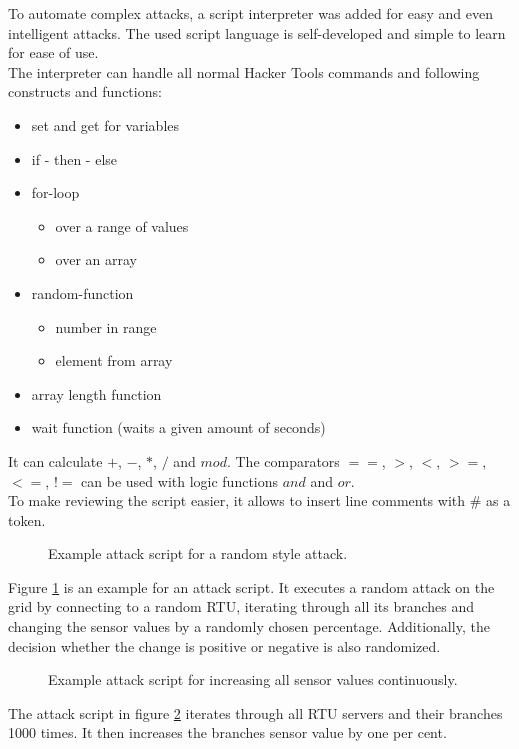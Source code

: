 \documentclass[conference]{IEEEtran}
\begin{document}
			To automate complex attacks, a script interpreter was added for easy and even intelligent attacks. The used script language is self-developed and simple to learn for ease of use.\\
			The interpreter can handle all normal Hacker Tools commands and following constructs and functions:
			\begin{itemize}
				\item set and get for variables
				\item if - then - else
				\item for-loop
					\begin{itemize}
						\item over a range of values
						\item over an array
					\end{itemize}
				\item random-function
					\begin{itemize}
						\item number in range
						\item element from array
					\end{itemize}
				\item array length function
				\item wait function (waits a given amount of seconds)
			\end{itemize}
			It can calculate $+$, $-$, $*$, $/$ and $mod$. The comparators $==$, $>$, $<$, $>=$, $<=$, $!=$ can be used with logic functions $and$ and $or$. \\
			To make reviewing the script easier, it allows to insert line comments with $\#$ as a token.
			
			\begin{figure}[!htp]
				
				\caption{Example attack script for a random style attack.}
				\label{script:random}
			\end{figure}
			Figure \ref{script:random} is an example for an attack script. It executes a random attack on the grid by connecting to a random RTU, iterating through all its branches and changing the sensor values by a randomly chosen percentage. Additionally, the decision whether the change is positive or negative is also randomized.
			
			\begin{figure}[!htp]
				
				\caption{Example attack script for increasing all sensor values continuously.}
				\label{script:increaseall}
			\end{figure}
			The attack script in figure \ref{script:increaseall} iterates through all RTU servers and their branches 1000 times. It then increases the branches sensor value by one per cent.
			
\end{document}
